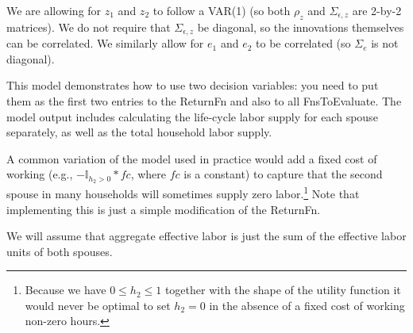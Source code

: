 We are allowing for $z_1$ and $z_2$ to follow a VAR(1) (so both $\rho_z$ and $\Sigma_{\epsilon,z}$ are 2-by-2 matrices). We do not require that $\Sigma_{\epsilon,z}$ be diagonal, so the innovations themselves can be correlated. We similarly allow for $e_1$ and $e_2$ to be correlated (so $\Sigma_{e}$ is not diagonal).

This model demonstrates how to use two decision variables: you need to put them as the first two entries to the ReturnFn and also to all FnsToEvaluate. The model output includes calculating the life-cycle labor supply for each spouse separately, as well as the total household labor supply.

A common variation of the model used in practice would add a fixed cost of working (e.g., $-\mathbb{I}_{h_2>0}*fc$, where $fc$ is a constant) to capture that the second spouse in many households will sometimes supply zero labor.\footnote{Because we have $0\leq h_2 \leq 1$ together with the shape of the utility function it would never be optimal to set $h_2=0$ in the absence of a fixed cost of working non-zero hours.} Note that implementing this is just a simple modification of the ReturnFn.

We will assume that aggregate effective labor is just the sum of the effective labor units of both spouses.

